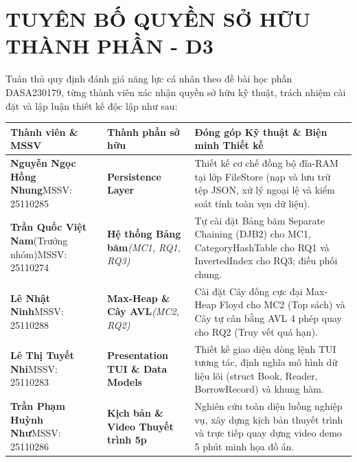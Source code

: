 \documentclass[14pt,a4paper]{extarticle}
\begin{document}
\newpage
\thispagestyle{empty}
\begingroup
\titlespacing*{\section}{0pt}{0pt}{4pt}
\section*{TUYÊN BỐ QUYỀN SỞ HỮU THÀNH PHẦN - D3}

\vspace{-0.25cm}
\noindent
Tuân thủ quy định đánh giá năng lực cá nhân theo đề bài học phần DASA230179, từng thành viên xác nhận quyền sở hữu kỹ thuật, trách nhiệm cài đặt và lập luận thiết kế độc lập như sau:

\vspace{0.15cm}
\noindent
\begingroup
{}
\setlength{\tabcolsep}{3pt}
\renewcommand{\arraystretch}{0.95}
\begin{tabularx}{\linewidth}{|>{\raggedright\arraybackslash}m{3.1cm}|>{\raggedright\arraybackslash}m{2.8cm}|>{\raggedright\arraybackslash}X|}
\hline
\textbf{Thành viên \& MSSV} & \textbf{Thành phần sở hữu} & \textbf{Đóng góp Kỹ thuật \& Biện minh Thiết kế} \\ \hline
\textbf{Nguyễn Ngọc Hồng Nhung}\newline MSSV: 25110285 & \textbf{Persistence Layer} & Thiết kế cơ chế đồng bộ đĩa-RAM tại lớp FileStore (nạp và lưu trữ tệp JSON, xử lý ngoại lệ và kiểm soát tính toàn vẹn dữ liệu). \\ \hline
\textbf{Trần Quốc Việt Nam}\newline (Trưởng nhóm)\newline MSSV: 25110274 & \textbf{Hệ thống Bảng băm}\newline \textit{(MC1, RQ1, RQ3)} & Tự cài đặt Bảng băm Separate Chaining (DJB2) cho MC1, CategoryHashTable cho RQ1 và InvertedIndex cho RQ3; điều phối chung. \\ \hline
\textbf{Lê Nhật Ninh}\newline MSSV: 25110288 & \textbf{Max-Heap \& Cây AVL}\newline \textit{(MC2, RQ2)} & Cài đặt Cây đống cực đại Max-Heap Floyd cho MC2 (Top sách) và Cây tự cân bằng AVL 4 phép quay cho RQ2 (Truy vết quá hạn). \\ \hline
\textbf{Lê Thị Tuyết Nhi}\newline MSSV: 25110283 & \textbf{Presentation TUI \& Data Models} & Thiết kế giao diện dòng lệnh TUI tương tác, định nghĩa mô hình dữ liệu lõi (struct Book, Reader, BorrowRecord) và khung hàm. \\ \hline
\textbf{Trần Phạm Huỳnh Như}\newline MSSV: 25110286 & \textbf{Kịch bản \& Video Thuyết trình 5p} & Nghiên cứu toàn diện luồng nghiệp vụ, xây dựng kịch bản thuyết trình và trực tiếp quay dựng video demo 5 phút minh họa đồ án. \\ \hline
\end{tabularx}
\endgroup
\end{document}
